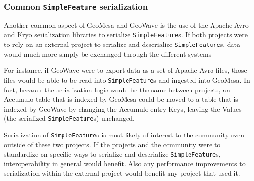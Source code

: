 \subsubsection{Common \texttt{SimpleFeature} serialization}
\label{sec:conclusions:collaboration:serialization}

Another common aspect of GeoMesa and GeoWave is the use of the Apache Avro and Kryo serialization libraries to serialize \texttt{SimpleFeature}s.
If both projects were to rely on an external project to serialize and deserialize \texttt{SimpleFeature}s, data would much more simply be exchanged through the different systems.

For instance, if GeoWave were to export data as a set of Apache Avro files, those files would be able to be read into \texttt{SimpleFeature}s and ingested into GeoMesa.
In fact, because the serialization logic would be the same between projects, an Accumulo table that is indexed by GeoMesa could be moved to a table that is indexed by GeoWave by changing the Accumulo entry Keys, leaving the Values (the serialized \texttt{SimpleFeature}s) unchanged.

Serialization of \texttt{SimpleFeature}s is most likely of interest to the community even outside of these two projects.
If the projects and the community were to standardize on specific ways to serialize and deserialize \texttt{SimpleFeature}s, interoperability in general would benefit.
Also any performance improvements to serialization within the external project would benefit any project that used it.
